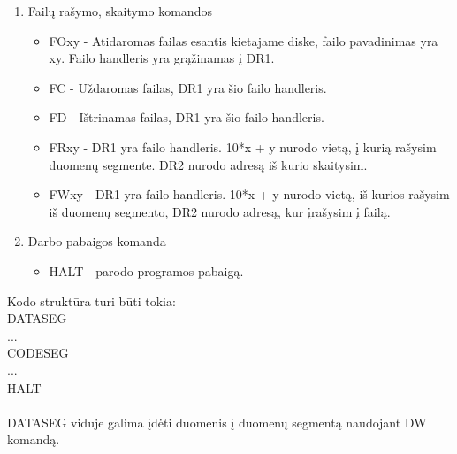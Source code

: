 \begin{enumerate}
	\item Failų rašymo, skaitymo komandos
		\begin{itemize}
		\item FOxy - Atidaromas failas esantis kietajame diske, failo pavadinimas yra xy. Failo handleris yra grąžinamas į DR1.
		\item FC - Uždaromas failas, DR1 yra šio failo handleris.
		\item FD - Ištrinamas failas, DR1 yra šio failo handleris.
		\item FRxy - DR1 yra failo handleris. 10*x + y nurodo vietą, į kurią rašysim duomenų segmente. DR2 nurodo adresą iš kurio skaitysim.
		\item FWxy - DR1 yra failo handleris. 10*x + y nurodo vietą, iš kurios rašysim iš duomenų segmento, DR2 nurodo adresą, kur įrašysim į failą.
		\end{itemize}
	\item Darbo pabaigos komanda
		\begin{itemize}
		\item HALT - parodo programos pabaigą.
		\end{itemize}
	\end{enumerate}
	Kodo struktūra turi būti tokia:\\
	DATASEG\\
	...\\
	CODESEG\\
	...\\
	HALT\\
	\\
	DATASEG viduje galima įdėti duomenis į duomenų segmentą naudojant DW komandą.
\clearpage